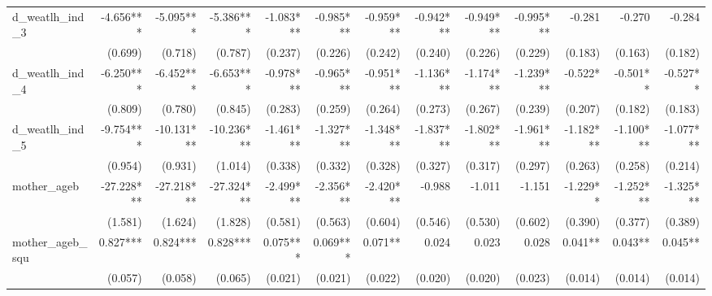 \begin{tabular}{lrrrrrrrrrrrr}
d\_weatlh\_ind\_3                           &    -4.656*** &    -5.095*** &    -5.386*** &    -1.083*** &    -0.985*** &    -0.959*** &    -0.942*** &    -0.949*** &    -0.995*** &       -0.281 &       -0.270 &       -0.284 \\ 
                                            &      (0.699) &      (0.718) &      (0.787) &      (0.237) &      (0.226) &      (0.242) &      (0.240) &      (0.226) &      (0.229) &      (0.183) &      (0.163) &      (0.182) \\ 
d\_weatlh\_ind\_4                           &    -6.250*** &    -6.452*** &    -6.653*** &    -0.978*** &    -0.965*** &    -0.951*** &    -1.136*** &    -1.174*** &    -1.239*** &      -0.522* &     -0.501** &     -0.527** \\ 
                                            &      (0.809) &      (0.780) &      (0.845) &      (0.283) &      (0.259) &      (0.264) &      (0.273) &      (0.267) &      (0.239) &      (0.207) &      (0.182) &      (0.183) \\ 
d\_weatlh\_ind\_5                           &    -9.754*** &   -10.131*** &   -10.236*** &    -1.461*** &    -1.327*** &    -1.348*** &    -1.837*** &    -1.802*** &    -1.961*** &    -1.182*** &    -1.100*** &    -1.077*** \\ 
                                            &      (0.954) &      (0.931) &      (1.014) &      (0.338) &      (0.332) &      (0.328) &      (0.327) &      (0.317) &      (0.297) &      (0.263) &      (0.258) &      (0.214) \\ 
mother\_ageb                                &   -27.228*** &   -27.218*** &   -27.324*** &    -2.499*** &    -2.356*** &    -2.420*** &       -0.988 &       -1.011 &       -1.151 &     -1.229** &    -1.252*** &    -1.325*** \\ 
                                            &      (1.581) &      (1.624) &      (1.828) &      (0.581) &      (0.563) &      (0.604) &      (0.546) &      (0.530) &      (0.602) &      (0.390) &      (0.377) &      (0.389) \\ 
mother\_ageb\_squ                           &     0.827*** &     0.824*** &     0.828*** &     0.075*** &     0.069*** &      0.071** &        0.024 &        0.023 &        0.028 &      0.041** &      0.043** &      0.045** \\ 
                                            &      (0.057) &      (0.058) &      (0.065) &      (0.021) &      (0.021) &      (0.022) &      (0.020) &      (0.020) &      (0.023) &      (0.014) &      (0.014) &      (0.014) \\ 

\end{tabular}
